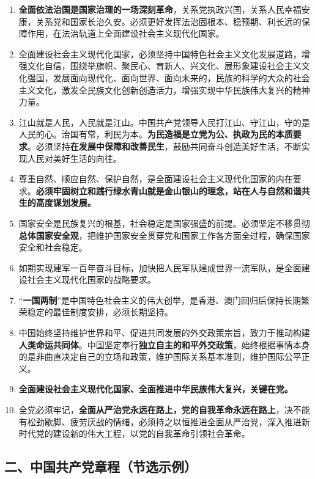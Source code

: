 \documentclass[UTF8,11pt,a4paper]{ctexart}
\begin{document}
\begin{enumerate}[label=\arabic*., leftmargin=2.3em]
\item \textbf{全面依法治国是国家治理的一场深刻革命}，关系党执政兴国，关系人民幸福安康，关系党和国家长治久安。必须更好发挥法治固根本、稳预期、利长远的保障作用，在法治轨道上全面建设社会主义现代化国家。
\item 全面建设社会主义现代化国家，必须坚持中国特色社会主义文化发展道路，增强文化自信，围绕举旗帜、聚民心、育新人、兴文化、展形象建设社会主义文化强国，发展面向现代化、面向世界、面向未来的，民族的科学的大众的社会主义文化，激发全民族文化创新创造活力，增强实现中华民族伟大复兴的精神力量。
\item 江山就是人民，人民就是江山。中国共产党领导人民打江山、守江山，守的是人民的心。治国有常，利民为本。\textbf{为民造福是立党为公、执政为民的本质要求}。必须坚持\textbf{在发展中保障和改善民生}，鼓励共同奋斗创造美好生活，不断实现人民对美好生活的向往。
\item 尊重自然、顺应自然、保护自然，是全面建设社会主义现代化国家的内在要求。\textbf{必须牢固树立和践行绿水青山就是金山银山的理念，站在人与自然和谐共生的高度谋划发展。}
\item 国家安全是民族复兴的根基，社会稳定是国家强盛的前提。必须坚定不移贯彻\textbf{总体国家安全观}，把维护国家安全贯穿党和国家工作各方面全过程，确保国家安全和社会稳定。
\item 如期实现建军一百年奋斗目标，加快把人民军队建成世界一流军队，是全面建设社会主义现代化国家的战略要求。
\item “\textbf{一国两制}”是中国特色社会主义的伟大创举，是香港、澳门回归后保持长期繁荣稳定的最佳制度安排，必须长期坚持。
\item 中国始终坚持维护世界和平、促进共同发展的外交政策宗旨，致力于推动构建\textbf{人类命运共同体}。中国坚定奉行\textbf{独立自主的和平外交政策}，始终根据事情本身的是非曲直决定自己的立场和政策，维护国际关系基本准则，维护国际公平正义。
\item \textbf{全面建设社会主义现代化国家、全面推进中华民族伟大复兴，关键在党。}
\item 全党必须牢记，\textbf{全面从严治党永远在路上，党的自我革命永远在路上}，决不能有松劲歇脚、疲劳厌战的情绪，必须持之以恒推进全面从严治党，深入推进新时代党的建设新的伟大工程，以党的自我革命引领社会革命。
\end{enumerate}

\subsection*{二、中国共产党章程（节选示例）}
\end{document}
